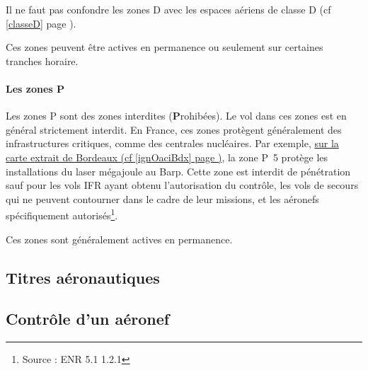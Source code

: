 			\alert{Il ne faut pas confondre les zones D avec les espaces aériens de classe D (cf \ref{classeD} page \pageref{classeD}).}
			
			Ces zones peuvent être actives en permanence ou seulement sur certaines tranches horaire.
			
			\paragraph{Les zones P}
			Les zones P sont des zones interdites (\textbf{P}rohibées). Le vol dans ces zones est en général strictement interdit. En France, ces zones protègent généralement des infrastructures critiques, comme des centrales nucléaires. Par exemple, \hyperlink{ignOaciBordeaux.1}{sur la carte extrait de Bordeaux (cf \ref{ignOaciBdx} page \pageref{ignOaciBdx})}, la zone P~5 protège les installations du laser mégajoule au Barp. Cette zone est interdit de pénétration sauf pour les vols IFR ayant obtenu l'autorisation du contrôle, les vols de secours qui ne peuvent contourner dans le cadre de leur missions, et les aéronefs spécifiquement autorisés\footnote{Source : ENR 5.1 1.2.1}.
			
			Ces zones sont généralement actives en permanence.
	
	\subsection{Titres aéronautiques}
	
	\subsection{Contrôle d'un aéronef}